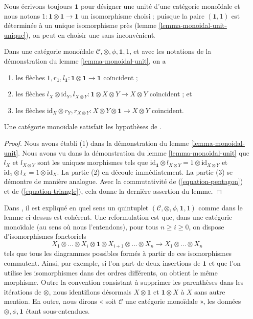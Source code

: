 \noindent
Nous écrivons toujours $\mathbf{1}$ pour désigner une unité d'une catégorie
monoïdale et nous notons $1 : \mathbf{1} \otimes \mathbf{1} \to \mathbf{1}$
un isomorphisme choisi ; puisque la paire $(\mathbf{1}, 1)$ est déterminée
à un unique isomorphisme près (lemme \ref{lemma-monoidal-unit-unique}),
on peut en choisir une sans inconvénient.

\begin{lemma}
\label{lemma-monoidal-coherence}
Dans une catégorie monoïdale $\mathcal{C}, \otimes, \phi, \mathbf{1}, 1$,
et avec les notations de la démonstration du lemme \ref{lemma-monoidal-unit},
on a
\begin{enumerate}
\item les flèches $1, r_\mathbf{1}, l_\mathbf{1} :
\mathbf{1} \otimes \mathbf{1} \to \mathbf{1}$ coïncident ;
\item les flèches
$l_X \otimes \text{id}_Y, l_{X \otimes Y} :
\mathbf{1} \otimes X \otimes Y \to X \otimes Y$ coïncident ; et
\item les flèches
$\text{id}_X \otimes r_Y , r_{X \otimes Y} :
X \otimes Y \otimes \mathbf{1} \to X \otimes Y$ coïncident.
\end{enumerate}
Une catégorie monoïdale satisfait les hypothèses de
\cite[Théorème 5.2]{associativity}.
\end{lemma}

\begin{proof}
Nous avons établi (1) dans la démonstration du
lemme \ref{lemma-monoidal-unit}.
Nous avons vu dans la démonstration du lemme \ref{lemma-monoidal-unit}
que $l_X$ et $l_{X \otimes Y}$ sont
les uniques morphismes tels que
$\text{id}_\mathbf{1} \otimes l_{X \otimes Y} =
1 \otimes \text{id}_{X \otimes Y}$ et
$\text{id}_\mathbf{1} \otimes l_X = 1 \otimes \text{id}_X$.
La partie (2) en découle immédiatement. La partie (3) se démontre de manière
analogue. Avec la commutativité de (\ref{equation-pentagon})
et de (\ref{equation-triangle}), cela donne la dernière assertion du lemme.
\end{proof}

\noindent
Dans \cite[Théorème 5.2]{associativity}, il est expliqué en quel sens un
quintuplet $(\mathcal{C}, \otimes, \phi, \mathbf{1}, 1)$ comme dans le lemme
ci-dessus est cohérent. Une reformulation est que, dans une catégorie monoïdale
(au sens où nous l'entendons), pour tous $n \geq i \geq 0$, on dispose
d'isomorphismes fonctoriels
$$
X_1 \otimes \ldots \otimes X_i \otimes \mathbf{1}
\otimes X_{i + 1} \otimes \ldots \otimes X_n
\to
X_1 \otimes \ldots \otimes X_n
$$
tels que tous les diagrammes possibles formés à partir de ces isomorphismes
commutent. Ainsi, par exemple, si l'on part de deux insertions de $\mathbf{1}$
et que l'on utilise les isomorphismes dans des ordres différents, on obtient le
même morphisme. Outre la convention consistant à supprimer les parenthèses dans
les itérations de $\otimes$, nous identifions désormais $X \otimes \mathbf{1}$
et $\mathbf{1} \otimes X$ à $X$ sans autre mention.
En outre, nous dirons « soit $\mathcal{C}$ une catégorie monoïdale »,
les données $\otimes, \phi, \mathbf{1}$ étant sous-entendues.

